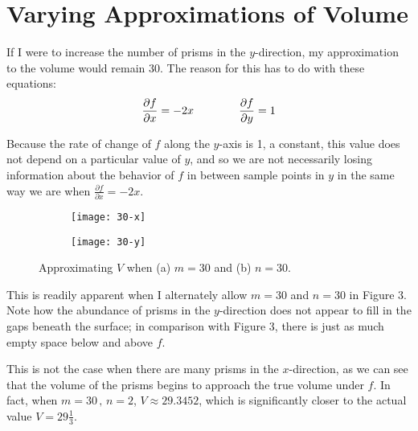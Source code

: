 \documentclass{article}
\begin{document}
\section{Varying Approximations of Volume}

If I were to increase the number of prisms in the $y$-direction, my approximation to the volume would remain 30. 
The reason for this has to do with these equations:
\begin{gather}
    \notag{\frac{\partial f}{\partial x} = -2x} \quad\quad\quad\quad \notag{\frac{\partial f}{\partial y} = 1}
\end{gather}

Because the rate of change of $f$ along the $y$-axis is 1, a constant, this value does not depend on a particular value
of $y$, and so we are not necessarily losing information about the behavior of $f$ in between sample points in $y$ in the
same way we are when $\frac{\partial f}{\partial x} = -2x$. 

\begin{figure}
    \centering
    \begin{subfigure}{.4\textwidth}
        \centering
        \texttt{[image: 30-x]}
    \end{subfigure}
    \begin{subfigure}{.4\textwidth}
        \centering
        \texttt{[image: 30-y]}
    \end{subfigure}
\caption{Approximating $V$ when (a) $m=30$ and (b) $n = 30$.}
\end{figure}
\pagebreak
This is readily apparent when I alternately allow $m = 30$ and $n = 30$
in Figure 3. Note how the abundance of prisms in the $y$-direction does not appear to fill in the gaps beneath the
surface; in comparison with Figure 3, there is just as much empty space below and above $f$. 

This is not the case when there are many prisms in the $x$-direction, as we can see that the volume of the prisms begins to approach the true volume under $f$.
In fact, when $m = 30\, , \, n = 2$, $V \approx 29.3452$, which is significantly closer to the actual value $V = 29\frac{1}{3}$.\\
\end{document}
